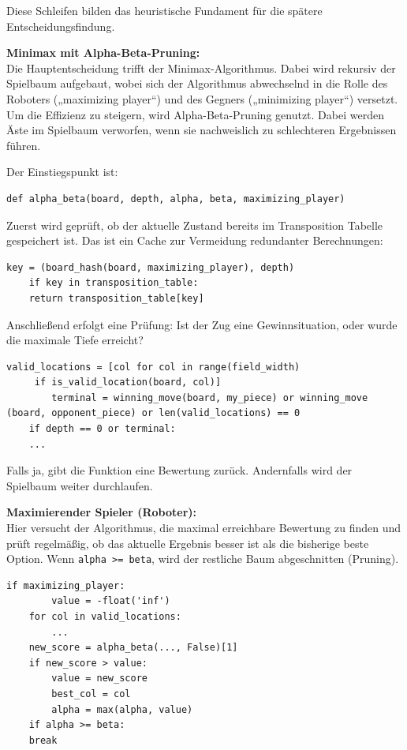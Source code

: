 Diese Schleifen bilden das heuristische Fundament für die spätere Entscheidungsfindung.

\textbf{Minimax mit Alpha-Beta-Pruning:}\\
Die Hauptentscheidung trifft der Minimax-Algorithmus. Dabei wird rekursiv der Spielbaum aufgebaut, wobei sich der Algorithmus abwechselnd in die Rolle des Roboters („maximizing player“) und des Gegners („minimizing player“) versetzt. Um die Effizienz zu steigern, wird Alpha-Beta-Pruning genutzt. Dabei werden Äste im Spielbaum verworfen, wenn sie nachweislich zu schlechteren Ergebnissen führen.

Der Einstiegspunkt ist:

\begin{lstlisting}[style=pythonstyle]
	def alpha_beta(board, depth, alpha, beta, maximizing_player)
\end{lstlisting}

Zuerst wird geprüft, ob der aktuelle Zustand bereits im Transposition Tabelle gespeichert ist. Das ist ein Cache zur Vermeidung redundanter Berechnungen:

\begin{lstlisting}[style=pythonstyle]
	key = (board_hash(board, maximizing_player), depth)
	if key in transposition_table:
	return transposition_table[key]
\end{lstlisting}

Anschließend erfolgt eine Prüfung: Ist der Zug eine Gewinnsituation, oder wurde die maximale Tiefe erreicht?

\begin{lstlisting}[style=pythonstyle]
	valid_locations = [col for col in range(field_width)
	 if is_valid_location(board, col)]
		terminal = winning_move(board, my_piece) or winning_move	(board, opponent_piece) or len(valid_locations) == 0
	if depth == 0 or terminal:
	...
\end{lstlisting}

Falls ja, gibt die Funktion eine Bewertung zurück. Andernfalls wird der Spielbaum weiter durchlaufen.

\textbf{Maximierender Spieler (Roboter):}\\
Hier versucht der Algorithmus, die maximal erreichbare Bewertung zu finden und prüft regelmäßig, ob das aktuelle Ergebnis besser ist als die bisherige beste Option. Wenn \texttt{alpha >= beta}, wird der restliche Baum abgeschnitten (Pruning).

\begin{lstlisting}[style=pythonstyle]
	if maximizing_player:
		value = -float('inf')
	for col in valid_locations:
		...
	new_score = alpha_beta(..., False)[1]
	if new_score > value:
		value = new_score
		best_col = col
		alpha = max(alpha, value)
	if alpha >= beta:
	break
\end{lstlisting}

